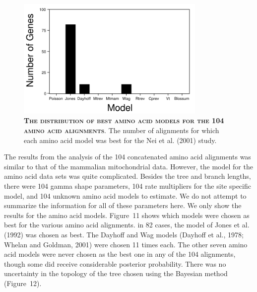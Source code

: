 \documentclass{svmult}
\begin{document}
\begin{figure}[t]
\centering
\includegraphics[height=2.3in]{fig11}
\caption{\textbf{\textsc{The distribution of best amino acid models for the 104 amino acid alignments}}.
The number of alignments  for which each amino acid model was best for the Nei et al. (2001) study.}
\label{fig11}
\end{figure}
The results from the analysis of the 104 concatenated amino acid alignments was similar to that of
the mammalian mitochondrial data. However, the model for the amino acid data sets was quite
complicated. Besides the tree and branch lengths, there were 104 gamma shape parameters, 104 rate
multipliers for the site specific model, and 104 unknown amino acid models to estimate. We do not
attempt to summarize the information for all of these parameters here. We only show the results for
the amino acid models. Figure~11 shows which models were chosen as best for the various amino acid
alignments. in 82 cases, the model of Jones et al. (1992) was chosen as best. The Dayhoff and Wag
models (Dayhoff et al., 1978; Whelan and Goldman, 2001) were chosen 11 times each. The other seven
amino acid models were never chosen as the best one in any of the 104 alignments, though some did
receive considerable posterior probability. There was no uncertainty in the topology of the tree
chosen using the Bayesian method (Figure~12).
\end{document}
